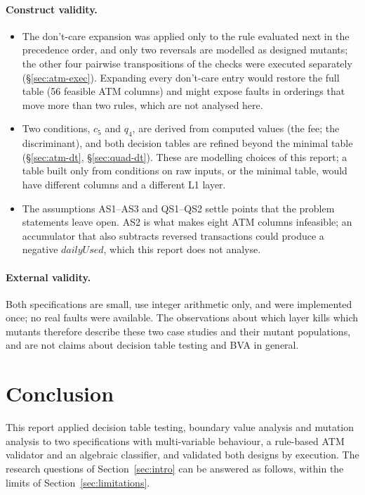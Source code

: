 \documentclass[11pt,a4paper]{article}
\begin{document}
\paragraph{Construct validity.}
\begin{itemize}
    \item The don't-care expansion was applied only to the rule evaluated
    next in the precedence order, and only two reversals are modelled as
    designed mutants; the other four pairwise transpositions of the checks
    were executed separately (\S\ref{sec:atm-exec}). Expanding every don't-care
    entry would restore the full table (56 feasible ATM columns) and might
    expose faults in orderings that move more than two rules, which are not
    analysed here.
    \item Two conditions, \(c_5\) and \(q_4\), are derived from computed
    values (the fee; the discriminant), and both decision tables are refined
    beyond the minimal table (\S\ref{sec:atm-dt}, \S\ref{sec:quad-dt}). These
    are modelling choices of this report; a table built only from conditions
    on raw inputs, or the minimal table, would have different columns and a
    different L1 layer.
    \item The assumptions AS1--AS3 and QS1--QS2 settle points that the problem
    statements leave open. AS2 is what makes eight ATM columns infeasible; an
    accumulator that also subtracts reversed transactions could produce a
    negative \(\mathit{dailyUsed}\), which this report does not analyse.
\end{itemize}

\paragraph{External validity.} Both specifications are small, use integer
arithmetic only, and were implemented once; no real faults were available.
The observations about which layer kills which mutants therefore describe
these two case studies and their mutant populations, and are not claims
about decision table testing and BVA in general.

\section{Conclusion}
\label{sec:conclusion}

This report applied decision table testing, boundary value analysis and
mutation analysis to two specifications with multi-variable behaviour, a
rule-based ATM validator and an algebraic classifier, and validated both
designs by execution. The research questions of Section~\ref{sec:intro} can
be answered as follows, within the limits of Section~\ref{sec:limitations}.
\end{document}
